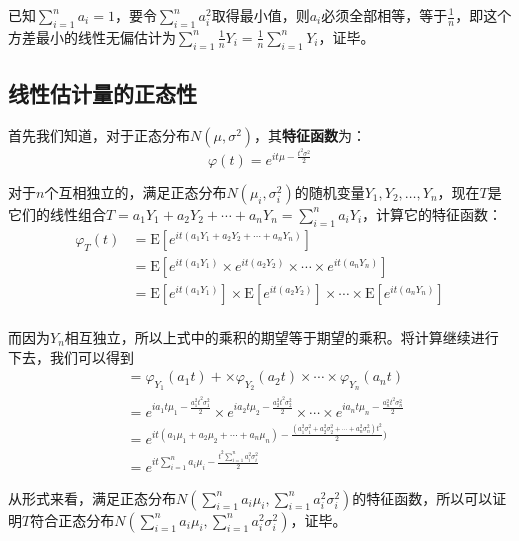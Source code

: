 \documentclass[UTF8]{ctexbook}
\begin{document}
已知$\sum_{i=1}^na_i=1$，要令$\sum_{i=1}^na_i^2$取得最小值，则$a_i$必须全部相等，等于$\frac{1}{n}$，即这个方差最小的线性无偏估计为$\sum_{i=1}^n\frac{1}{n}Y_i=\frac{1}{n}\sum_{i=1}^nY_i$，证毕。

\subsection{线性估计量的正态性}
\label{proof5}
首先我们知道，对于正态分布$N(\mu, \sigma^2)$，其\textbf{特征函数}为：
\[
	\varphi(t)=e^{it\mu-\frac{t^2\sigma^2}{2}}
\]

对于$n$个互相独立的，满足正态分布$N(\mu_i,\sigma_i^2)$的随机变量$Y_1,Y_2,\dots,Y_n$，现在$T$是它们的线性组合$T=a_1Y_1+a_2Y_2+\cdots+a_nY_n=\sum_{i=1}^na_iY_i$，计算它的特征函数：
\[
	\begin{aligned}
	\varphi_T(t)&=\mathrm E[e^{it(a_1Y_1+a_2Y_2+\cdots+a_nY_n)}]\\
	&=\mathrm E[e^{it(a_1Y_1)}\times e^{it(a_2Y_2)}\times \cdots \times e^{it(a_nY_n)}]\\
	&=\mathrm E[e^{it(a_1Y_1)}]\times \mathrm E[e^{it(a_2Y_2)}] \times \cdots \times \mathrm E[e^{it(a_nY_n)}]\\
	\end{aligned}
\]

而因为$Y_n$相互独立，所以上式中的乘积的期望等于期望的乘积。将计算继续进行下去，我们可以得到
\begin{align*}
	&=\varphi_{Y_1}(a_1t)+\times\varphi_{Y_2}(a_2t)\times\cdots\times\varphi_{Y_n}(a_nt)\\
	&=e^{ia_1t\mu_1-\frac{a_1^2t^2\sigma_1^2}{2}}\times e^{ia_2t\mu_2-\frac{a_2^2t^2\sigma_2^2}{2}}\times\cdots\times e^{ia_nt\mu_n-\frac{a_n^2t^2\sigma_n^2}{2}}\\
	&=e^{it(a_1\mu_1+a_2\mu_2+\cdots+a_n\mu_n)-\frac{(a_1^2\sigma_1^2+a_2^2\sigma_2^2+\cdots+a_n^2\sigma_n^2)t^2}{2})}\\
	&=e^{it\sum_{i=1}^na_i\mu_i-\frac{t^2\sum_{i=1}^na_i^2\sigma_i^2}{2}}
\end{align*}

从形式来看，满足正态分布$N(\sum_{i=1}^na_i\mu_i, \sum_{i=1}^na_i^2\sigma_i^2)$的特征函数，所以可以证明$T$符合正态分布$N(\sum_{i=1}^na_i\mu_i, \sum_{i=1}^na_i^2\sigma_i^2)$，证毕。
\end{document}
